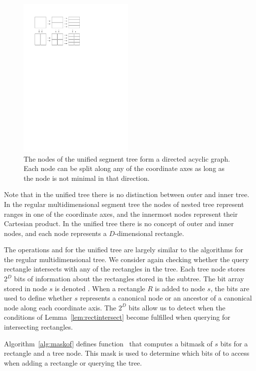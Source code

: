\documentclass[english,gradu]{tktltiki2018}
\begin{document}
\begin{figure}\centering
	\includegraphics[width=0.5\textwidth]{fig/unified}
	\caption{The nodes of the unified segment tree form a directed acyclic graph.
	Each node can be split along any of the coordinate axes as long as the node is not minimal in that direction.}\label{fig:unified}
\end{figure}

Note that in the unified tree there is no distinction between outer and inner tree.
In the regular multidimensional segment tree the nodes of nested tree represent ranges in one of the coordinate axes, and the innermost nodes represent their Cartesian product.
In the unified tree there is no concept of outer and inner nodes, and each node represents a $D$-dimensional rectangle.

The operations \adddt and \checkdt for the unified tree are largely similar to the algorithms for the regular multidimensional tree.
We consider again checking whether the query rectangle intersects with any of the rectangles in the tree.
Each tree node stores $2^D$ bits of information about the rectangles stored in the subtree.
The bit array stored in node $s$ is denoted .
When a rectangle $R$ is added to node $s$, the bits are used to define whether $s$ represents a canonical node or an ancestor of a canonical node along each coordinate axis.
The $2^D$ bits allow us to detect when the conditions of Lemma~\ref{lem:rectintersect} become fulfilled when querying for intersecting rectangles.

Algorithm~\ref{alg:maskof} defines function~\maskof{} that computes a bitmask of $s$ bits for a rectangle and a tree node.
This mask is used to determine which bits of  to access when adding a rectangle or querying the tree.
\end{document}
